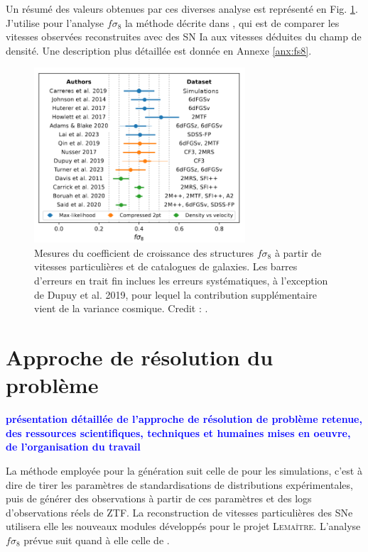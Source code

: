 \documentclass{book}
\newcommand{\consignes}[1]{{\textcolor{blue}{\bf \large #1}}}
\def\lemaitre{\textsc{Lemaître}\xspace}
\begin{document}
Un résumé des valeurs obtenues par ces diverses analyse est représenté en Fig. \ref{fig:carreres_11}. J'utilise pour l'analyse $f\sigma_8$ la méthode décrite dans \cite{boruah_cosmic_2020,stahl_peculiar-velocity_2021}, qui est de comparer les vitesses observées reconstruites avec des SN Ia aux vitesses déduites du champ de densité. Une description plus détaillée est donnée en Annexe \ref{anx:fs8}.

\begin{figure}
    \centering
    \includegraphics[width=0.7\textwidth]{figures/Carreres_fig_11.png}
    \caption{Mesures du coefficient de croissance des structures $f\sigma_8$ à partir de vitesses particulières et de catalogues de galaxies. Les barres d'erreurs en trait fin inclues les erreurs systématiques, à l'exception de Dupuy et al. 2019, pour lequel la contribution supplémentaire vient de la variance cosmique. Credit : 
    \cite{carreres_growth-rate_2023}.}
    \label{fig:carreres_11}
\end{figure}

\section{Approche de résolution du problème}
\consignes{présentation détaillée de l’approche de résolution de problème retenue, des ressources scientifiques, techniques et humaines mises en oeuvre, de l’organisation du travail}

La méthode employée pour la génération suit celle de \cite{carreres_growth-rate_2023} pour les simulations, c'est à dire de tirer les paramètres de standardisations de distributions expérimentales, puis de générer des observations à partir de ces paramètres et des logs d'observations réels de ZTF. La reconstruction de vitesses particulières des SNe utilisera elle les nouveaux modules développés pour le projet \lemaitre. L'analyse $f\sigma_8$ prévue suit quand à elle celle de \cite{boruah_cosmic_2020,stahl_peculiar-velocity_2021}.
\end{document}
